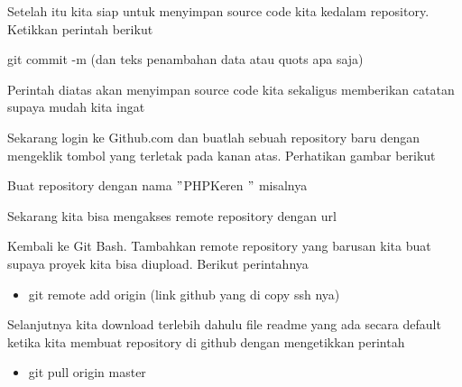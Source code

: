 \vspace{14pt}
\noindent 
{\fontsize{14pt}{14pt}\selectfont Setelah itu kita siap untuk menyimpan source code kita kedalam repository. Ketikkan perintah berikut \\} \par
\noindent 
{\fontsize{14pt}{14pt}\selectfont git commit -m (dan teks penambahan data atau quots apa saja) \\} \par
\vspace{14pt}
\noindent 
{\fontsize{14pt}{14pt}\selectfont Perintah diatas akan menyimpan source code kita sekaligus memberikan catatan supaya mudah kita ingat \\} \par
\vspace{14pt}
\noindent 
{\fontsize{14pt}{14pt}\selectfont Sekarang login ke Github.com dan buatlah sebuah repository baru dengan mengeklik tombol yang terletak pada kanan atas. Perhatikan gambar berikut \\} \par
\vspace{14pt}
\noindent 
{\fontsize{14pt}{14pt}\selectfont Buat repository dengan nama  $ " $PHPKeren $ " $ misalnya \\} \par
\vspace{14pt}
\noindent 
{\fontsize{14pt}{14pt}\selectfont Sekarang kita bisa mengakses remote repository dengan url \\} \par
\vspace{14pt}
\noindent 
{\fontsize{14pt}{14pt}\selectfont Kembali ke Git Bash. Tambahkan remote repository yang barusan kita buat supaya proyek kita bisa diupload. Berikut perintahnya \\} \par
\begin{itemize}
	\item git remote add origin (link github yang di copy ssh nya)
\end{itemize}

\vspace{14pt}
\noindent 
{\fontsize{14pt}{14pt}\selectfont Selanjutnya kita download terlebih dahulu file readme yang ada secara default ketika kita membuat repository di github dengan mengetikkan perintah \\} \par
\begin{itemize}
	\item git pull origin master
\end{itemize}

